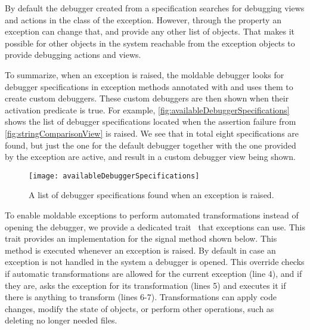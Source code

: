\documentclass[sigplan,screen]{acmart} %
\begin{document}
By default the debugger created from a specification searches for debugging views and actions in the class of the exception.
However, through the  property an exception can change that, and provide any other list of objects.
That makes it possible for other objects in the system reachable from the exception objects to provide debugging actions and views.


To summarize, when an exception is raised, the moldable debugger looks for debugger specifications in exception methods annotated with   and uses them to create custom debuggers.
These custom debuggers are then shown when their activation predicate is true.
For example, \autoref{fig:availableDebuggerSpecifications} shows the list of debugger specifications located when the assertion failure from \autoref{fig:stringComparisonView} is raised.
We see that in total eight specifications are found, but just the one for the default debugger together with the one provided by the exception are active, and result in a custom debugger view being shown.

\begin{figure}[h]
  \texttt{[image: availableDebuggerSpecifications]}
  \caption{A list of debugger specifications found when an exception is raised.}
  \label{fig:availableDebuggerSpecifications}
\end{figure}

To enable moldable exceptions to perform automated transformations instead of opening the debugger, we provide a dedicated trait~\cite{Duca06b} that exceptions can use.
This trait provides an implementation for the signal method shown below.
This method is executed whenever an exception is raised.
By default in case an exception is not handled in the system a debugger is opened.
This override checks if automatic transformations are allowed for the current exception (line 4), and if they are, asks the exception for its transformation (lines 5) and executes it if there is anything to transform (lines 6-7).
Transformations can apply code changes, modify the state of objects, or perform other operations, such as deleting no longer needed files.
\end{document}
